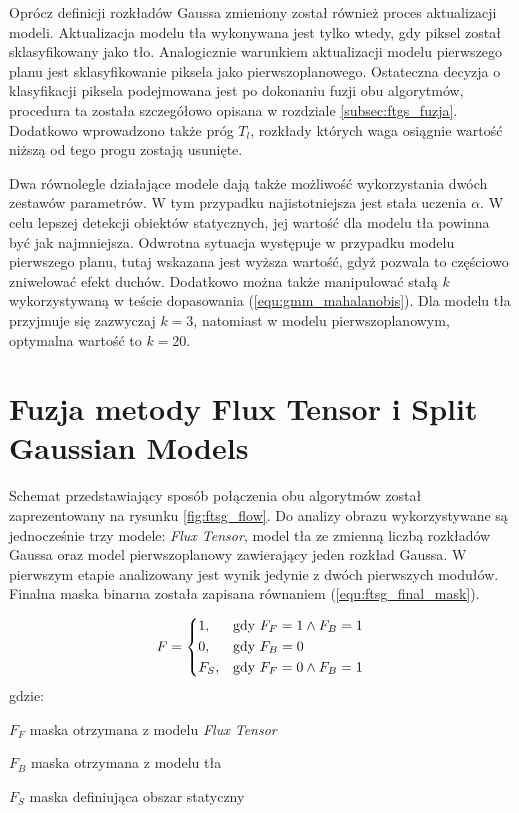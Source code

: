 Oprócz definicji rozkładów Gaussa zmieniony został również proces aktualizacji modeli. Aktualizacja modelu tła wykonywana jest tylko wtedy, gdy piksel został sklasyfikowany jako tło. Analogicznie warunkiem aktualizacji modelu pierwszego planu jest sklasyfikowanie piksela jako pierwszoplanowego. Ostateczna decyzja o klasyfikacji piksela podejmowana jest po dokonaniu fuzji obu algorytmów, procedura ta została szczegółowo opisana w rozdziale \ref{subsec:ftgs_fuzja}. Dodatkowo wprowadzono także próg $T_l$, rozkłady których waga osiągnie wartość niższą od tego progu zostają usunięte.

Dwa równolegle działające modele dają także możliwość wykorzystania dwóch zestawów parametrów. W tym przypadku najistotniejsza jest stała uczenia $\alpha$. W celu lepszej detekcji obiektów statycznych, jej wartość dla modelu tła powinna być jak najmniejsza. Odwrotna sytuacja występuje w przypadku modelu pierwszego planu, tutaj wskazana jest wyższa wartość, gdyż pozwala to częściowo zniwelować efekt duchów. Dodatkowo można także manipulować stałą $k$ wykorzystywaną w teście dopasowania (\ref{equ:gmm_mahalanobis}). Dla modelu tła przyjmuje się zazwyczaj $k=3$, natomiast w modelu pierwszoplanowym, optymalna wartość to $k=20$. 

\section{Fuzja metody Flux Tensor i Split Gaussian Models}
\label{sec:ftsg_fuzja}

Schemat przedstawiający sposób połączenia obu algorytmów został zaprezentowany na rysunku \ref{fig:ftsg_flow}. Do analizy obrazu wykorzystywane są jednocześnie trzy modele: \textit{Flux Tensor}, model tła ze zmienną liczbą rozkładów Gaussa oraz model pierwszoplanowy zawierający jeden rozkład Gaussa. W pierwszym etapie analizowany jest wynik jedynie z dwóch pierwszych modułów. Finalna maska binarna została zapisana równaniem (\ref{equ:ftsg_final_mask}).

\begin{equation}
    F= 
\begin{dcases}
    1,   & \text{gdy }  F_F = 1 \land F_B = 1\\
    0,   & \text{gdy }  F_B = 0\\ 
    F_S, & \text{gdy }  F_F = 0 \land F_B = 1\\
\end{dcases}
\label{equ:ftsg_final_mask}
\end{equation}
gdzie:
\begin{eqwhere}[2cm]
	\item [$F_F$] maska otrzymana z modelu \textit{Flux Tensor}
	\item [$F_B$] maska otrzymana z modelu tła
	\item [$F_S$] maska definiująca obszar statyczny \\
\end{eqwhere}

